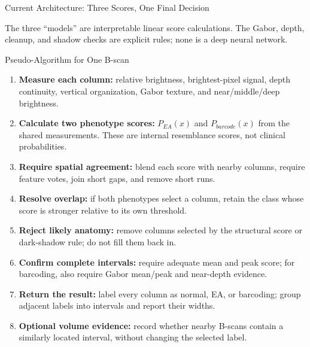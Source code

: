 \documentclass[aspectratio=169]{beamer}
\begin{document}
\begin{frame}{Current Architecture: Three Scores, One Final Decision}
{
}

\vspace{0.2cm}
\small The three ``models'' are interpretable linear score calculations. The
Gabor, depth, cleanup, and shadow checks are explicit rules; none is a deep
neural network.

\end{frame}

\begin{frame}{Pseudo-Algorithm for One B-scan}

\footnotesize
\begin{enumerate}
    \setlength{\itemsep}{2pt}
    \item \textbf{Measure each column:} relative brightness, brightest-pixel
    signal, depth continuity, vertical organization, Gabor texture, and
    near/middle/deep brightness.
    \item \textbf{Calculate two phenotype scores:}
    $P_{EA}(x)$ and $P_{barcode}(x)$ from the shared measurements. These are
    internal resemblance scores, not clinical probabilities.
    \item \textbf{Require spatial agreement:} blend each score with nearby
    columns, require feature votes, join short gaps, and remove short runs.
    \item \textbf{Resolve overlap:} if both phenotypes select a column, retain
    the class whose score is stronger relative to its own threshold.
    \item \textbf{Reject likely anatomy:} remove columns selected by the
    structural score or dark-shadow rule; do not fill them back in.
    \item \textbf{Confirm complete intervals:} require adequate mean and peak
    score; for barcoding, also require Gabor mean/peak and near-depth evidence.
    \item \textbf{Return the result:} label every column as normal, EA, or
    barcoding; group adjacent labels into intervals and report their widths.
    \item \textbf{Optional volume evidence:} record whether nearby B-scans
    contain a similarly located interval, without changing the selected label.
\end{enumerate}

\end{frame}
\end{document}
